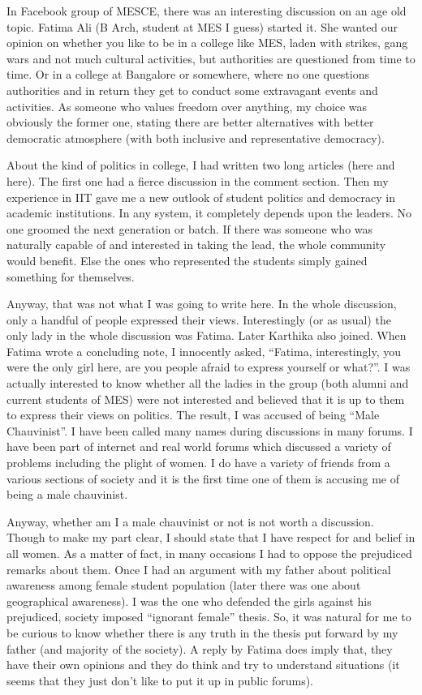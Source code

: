 \vskip 2pt

In Facebook group of MESCE, there was an interesting discussion on an age old topic. Fatima Ali (B Arch, student at MES I guess) started it. She wanted our opinion on whether you like to be in a college like MES, laden with strikes, gang wars and not much cultural activities, but authorities are questioned from time to time. Or in a college at Bangalore or somewhere, where no one questions authorities and in return they get to conduct some extravagant events and activities. As someone who values freedom over anything, my choice was obviously the former one, stating there are better alternatives with better democratic atmosphere (with both inclusive and representative democracy).

About the kind of politics in college, I had written two long articles (here and here). The first one had a fierce discussion in the comment section. Then my experience in IIT gave me a new outlook of student politics and democracy in academic institutions. In any system, it completely depends upon the leaders. No one groomed the next generation or batch. If there was someone who was naturally capable of and interested in taking the lead, the whole community would benefit. Else the ones who represented the students simply gained something for themselves.

Anyway, that was not what I was going to write here. In the whole discussion, only a handful of people expressed their views. Interestingly (or as usual) the only lady in the whole discussion was Fatima. Later Karthika also joined. When Fatima wrote a concluding note, I innocently asked, “Fatima, interestingly, you were the only girl here, are you people afraid to express yourself or what?”. I was actually interested to know whether all the ladies in the group (both alumni and current students of MES) were not interested and believed that it is up to them to express their views on politics. The result, I was accused of being “Male Chauvinist”. I have been called many names during discussions in many forums. I have been part of internet and real world forums which discussed a variety of problems including the plight of women. I do have a variety of friends from a various sections of society and it is the first time one of them is accusing me of being a male chauvinist.

Anyway, whether am I a male chauvinist or not is not worth a discussion. Though to make my part clear, I should state that I have respect for and belief in all women. As a matter of fact, in many occasions I had to oppose the prejudiced remarks about them. Once I had an argument with my father about political awareness among female student population (later there was one about geographical awareness). I was the one who defended the girls against his prejudiced, society imposed “ignorant female” thesis. So, it was natural for me to be curious to know whether there is any truth in the thesis put forward by my father (and majority of the society). A reply by Fatima does imply that, they have their own opinions and they do think and try to understand situations (it seems that they just don’t like to put it up in public forums).

